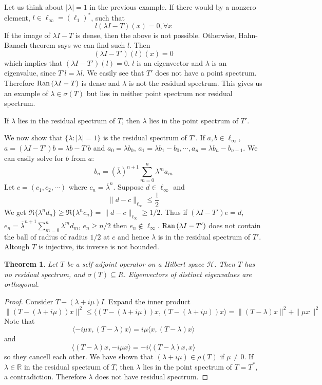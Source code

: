 \documentclass[12pt]{article}
\theoremstyle{plain}
\newtheorem{theorem}[equation]{Theorem}
\theoremstyle{definition}
\theoremstyle{named}
\newcommand{\shH}{\mathscr{H}}
\newcommand{\Ran}{{\rm Ran \,}}
\newcommand{\<}{\langle}
\renewcommand{\>}{\rangle}
\newcommand{\IR}{\mathbb{R}}
\begin{document}
Let us think about $|\lambda| = 1$ in the previous example. If there would by a nonzero element, $l \in \ell_\infty = (\ell_1)^*$, such that 
$$ l(\lambda I - T)(x) = 0 , \forall x $$
If the image of $\lambda I - T$ is dense, then the above is not possible. Otherwise, Hahn-Banach theorem says we can find such $l$. Then
$$ (\lambda I - T')(l)(x) = 0 $$
which implies that $(\lambda I - T')(l) = 0$. $l$ is an eigenvector and $\lambda$ is an eigenvalue, since $T' l = \lambda l$. We easily see that $T'$ does not have a point spectrum. Therefore $\Ran(\lambda I - T)$ is dense and $\lambda$ is not the residual spectrum. This gives us an example of $\lambda \in \sigma(T)$ but lies in neither point spectrum nor residual spectrum. 

If $\lambda$ lies in the residual spectrum of $T$, then $\lambda$ lies in the point spectrum of $T'$. 

We now show that $\{ \lambda : |\lambda| = 1 \}$ is the residual spectrum of $T'$. If $a, b \in \ell_\infty$, $a = (\lambda I - T') b = \lambda b - T' b$ and $a_0 = \lambda b_0$, $a_1 = \lambda b_1 - b_0, \cdots, a_n = \lambda b_n - b_{n - 1}$. We can easily solve for $b$ from $a$: $$b_n = (\overline{\lambda})^{n + 1} \sum_{m = 0}^n \lambda^m a_m$$ Let $c = (c_1, c_2, \cdots)$ where $c_n = \overline{\lambda}^n$. Suppose $d \in \ell_\infty$ and 
$$ \| d - c \|_{\ell_\infty} \le \frac{1}{2} $$
We get $\Re \{ \lambda^n d_n \} \ge \Re \{ \lambda^n c_n \} = \| d - c \|_{\ell_\infty} \ge 1/2$.  Thus if $(\lambda I - T') e = d$, $e_n = \overline{\lambda}^{n + 1} \sum_{m = 0}^n \lambda^m d_m$, $e_n \ge n/2$ then $e_n \not\in \ell_\infty$. $\Ran (\lambda I - T')$ does not contain the ball of radius of radius $1/2$ at $c$ and hence $\lambda$ is in the residual spectrum of $T'$. 
Altough $T$ is injective, its inverse is not bounded. 

\begin{theorem}
Let $T$ be a self-adjoint operator on a Hilbert space $\shH$. Then $T$ has no residual spectrum, and $\sigma(T) \subseteq R$. Eigenvectors of distinct eigenvalues are orthogonal. 
\end{theorem}
\begin{proof}
Consider $T - (\lambda + i \mu) I$. Expand the inner product $$\| (T - (\lambda + i \mu)) x \|^2 \le \< (T - (\lambda + i \mu)) x, (T - (\lambda + i \mu)) x \> = \| (T - \lambda) x \|^2 + \| \mu x \|^2  $$
Note that 
$$ \< - i \mu x, (T - \lambda) x \> = i \mu \< x, (T - \lambda) x \> $$
and 
$$ \< (T - \lambda) x, - i \mu x \>  = - i \< (T - \lambda)x, x \>$$
so they cancell each other. We have shown that $(\lambda + i \mu) \in \rho(T)$ if $\mu \neq 0$. If $\lambda \in \IR$ in the residual spectrum of $T$, then $\lambda$ lies in the point spectrum of $T = T^*$, a contradiction. Therefore $\lambda$ does not have residual spectrum.
\end{proof}
\end{document}
